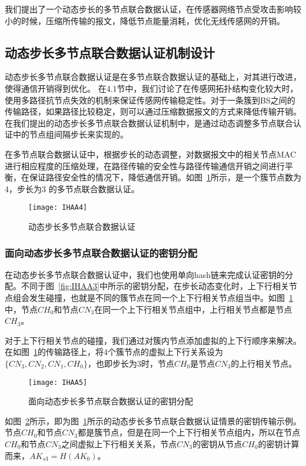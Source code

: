 我们提出了一个动态步长的多节点联合数据认证，在传感器网络节点受攻击影响较小的时候，压缩所传输的报文，降低节点能量消耗，优化无线传感网的开销。
\subsection{动态步长多节点联合数据认证机制设计}
动态步长多节点联合数据认证是在多节点联合数据认证的基础上，对其进行改进，使得通信开销得到优化。
在4.1节中，我们讨论了在传感网拓扑结构变化较大时，使用多路径抗节点失效的机制来保证传感网传输稳定性。对于一条簇到BS之间的传输路径，如果路径比较稳定，则可以通过压缩数据报文的方式来降低传输开销。在我们提出的动态步长多节点联合数据认证机制中，是通过动态调整多节点联合认证中的节点组间隔步长来实现的。

在多节点联合数据认证中，根据步长的动态调整，对数据报文中的相关节点MAC进行相应程度的压缩处理，在路径传输的安全性与路径传输通信开销之间进行平衡，在保证路径安全性的情况下，降低通信开销。如图~\ref{fig:IHAA4}所示，是一个簇节点数为4，步长为3 的多节点联合数据认证。
\begin{figure}[htbp]
  \centering
  \texttt{[image: IHAA4]}
  \caption{动态步长多节点联合数据认证}
  \label{fig:IHAA4}
\end{figure}
\subsubsection{面向动态步长多节点联合数据认证的密钥分配}
在动态步长多节点联合数据认证中，我们也使用单向hash链来完成认证密钥的分配。不同于图~\ref{fig:IHAA3}中所示的密钥分配，在步长动态变化时，上下行相关节点组会发生碰撞，也就是不同的簇节点在同一个上下行相关节点组当中。如图~\ref{fig:IHAA4}中，节点$CH_0$和节点$CN_3$在同一个上下行相关节点组中，上行相关节点都是节点$CH_3$。

对于上下行相关节点的碰撞，我们通过对簇内节点添加虚拟的上下行顺序来解决。在如图~\ref{fig:IHAA4}的传输路径上，将4个簇节点的虚拟上下行关系设为$\{CN_3,CN_2,CN_1,CH_0\}$，也即步长为3时，节点$CH_0$是节点$CN_3$的上行相关节点。

\begin{figure}[htbp]
  \centering
  \texttt{[image: IHAA5]}
  \caption{面向动态步长多节点联合数据认证的密钥分配}
  \label{fig:IHAA5}
\end{figure}

如图~\ref{fig:IHAA5}所示，即为图~\ref{fig:IHAA4}所示的动态步长多节点联合数据认证情景的密钥传输示例。节点$CH_0$和节点$CN_3$都是簇节点，但是在同一个上下行相关节点组内，所以在节点$CH_0$和节点$CN_3$之间虚拟上下行相关关系，节点$CN_3$的密钥从节点$CH_0$的密钥计算而来，$AK_{s3}=H(AK_0)$。
